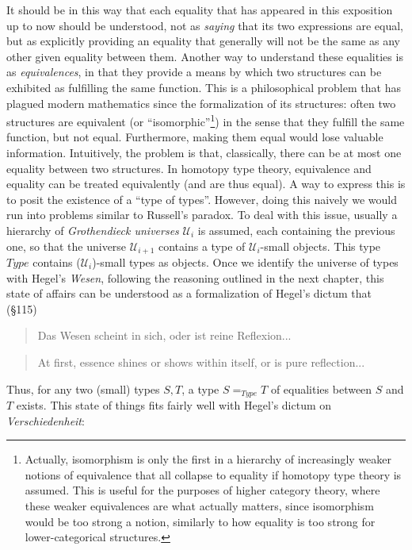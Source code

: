 \documentclass{article}
\begin{document}
It should be in this way that each equality that has appeared in this exposition up to now should be understood, not as \emph{saying} that its two expressions are equal, but as explicitly providing an equality that generally will not be the same as any other given equality between them. Another way to understand these equalities is as \emph{equivalences}, in that they provide a means by which two structures can be exhibited as fulfilling the same function. This is a philosophical problem that has plagued modern mathematics since the formalization of its structures: often two structures are equivalent (or ``isomorphic''\footnote{Actually, isomorphism is only the first in a hierarchy of increasingly weaker notions of equivalence that all collapse to equality if homotopy type theory is assumed. This is useful for the purposes of higher category theory, where these weaker equivalences are what actually matters, since isomorphism would be too strong a notion, similarly to how equality is too strong for lower-categorical structures.}) in the sense that they fulfill the same function, but not equal. Furthermore, making them equal would lose valuable information. Intuitively, the problem is that, classically, there can be at most one equality between two structures. In homotopy type theory, equivalence and equality can be treated equivalently (and are thus equal). A way to express this is to posit the existence of a ``type of types''. However, doing this naively we would run into problems similar to Russell's paradox. To deal with this issue, usually a hierarchy of \emph{Grothendieck universes} $\mathcal{U}_i$ is assumed, each containing the previous one, so that the universe $\mathcal{U}_{i+1}$ contains a type of $\mathcal{U}_i$-small objects. This type $Type$ contains ($\mathcal{U}_i$)-small types as objects. Once we identify the universe of types with Hegel's \emph{Wesen}, following the reasoning outlined in the next chapter, this state of affairs can be understood as a formalization of Hegel's dictum that (§115)

\begin{quote}
    Das Wesen scheint in sich, oder ist  reine Reflexion...
\end{quote}

\begin{quote}
    At first, essence shines or shows within itself, or is pure reflection...
\end{quote}

Thus, for any two (small) types $S, T$, a type $S=_{Type} T$ of equalities between $S$ and $T$ exists. This state of things fits fairly well with Hegel's dictum on \emph{Verschiedenheit}:
\end{document}
